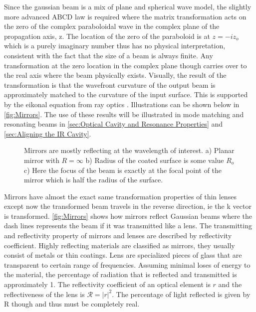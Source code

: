 \documentclass[11pt,a4paper]{book}
\newcommand{\imginput}[1]{} %
\begin{document}
		Since the gaussian beam is a mix of plane and spherical wave model, the slightly more advanced ABCD law is required where the matrix transformation acts on the zero of the complex paraboloidal wave in the complex plane of the propagation axis, z.
		The location of the zero of the paraboloid is at $z=-iz_o$ which is a purely imaginary number thus has no physical interpretation, consistent with the fact that the size of a beam is always finite.
		Any transformation at the zero location in the complex plane though carries over to the real axis where the beam physically exists.
		Visually, the result of the transformation is that the wavefront curvature of the output beam is approximately matched to the curvature of the input surface.
		This is supported by the eikonal equation from ray optics \cite{SalehTeichs}.
		Illustrations can be shown below in \autoref{fig:Mirrors}. 
		The use of these results will be illustrated in mode matching and resonating beams in \autoref{sec:Optical Cavity and Resonance Properties} and \autoref{sec:Aligning the IR Cavity}.
		
		\begin{figure} [!ht]
			\centering
			\def\svgwidth{\columnwidth}
			\resizebox{160mm}{!}{\imginput{images/Mirrors.pdf_tex}}
			\caption{\cite{SalehTeichs} Mirrors are mostly reflecting at the wavelength of interest.
				a) Planar mirror with $R=\infty$ \quad b) Radius of the coated surface is some value $R_o$ \quad c) Here the focus of the beam is exactly at the focal point of the mirror which is half the radius of the surface.
			}
			\label{fig:Mirrors}
		\end{figure}	
		
		Mirrors have almost the exact same transformation properties of thin lenses except now the transformed beam travels in the reverse direction, ie the k vector is transformed. \autoref{fig:Mirrors} shows how mirrors reflect Gaussian beams where the dash lines represents the beam if it was transmitted like a lens.
		The transmitting and reflectivity property of mirrors and lenses are described by reflectivity coefficient. 
		Highly reflecting materials are classified as mirrors, they usually consist of metals or thin coatings. 
		Lens are specialized pieces of glass that are transparent to certain range of frequencies.
		Assuming minimal loses of energy to the material, the percentage of radiation that is reflected and transmitted is approximately 1. 
		The reflectivity coefficient of an optical element is $r$ and the reflectiveness of the lens is $\mathcal{R}=|r|^2$. The percentage of light reflected is given by R though and thus must be completely real.
		
\end{document}

